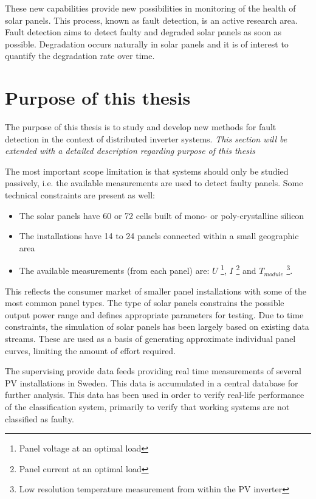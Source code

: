 These new capabilities provide new possibilities in monitoring of the health of solar panels.
This process, known as fault detection, is an active research area.
Fault detection aims to detect faulty and degraded solar panels as soon as possible. 
Degradation occurs naturally in solar panels and it is of interest to quantify the degradation rate over time.

\section{Purpose of this thesis}
The purpose of this thesis is to study and develop new methods for fault detection in the context of distributed inverter systems.
\emph{This section will be extended with a detailed description regarding purpose of this thesis}

The most important scope limitation is that systems should only be studied passively, i.e. the available measurements are used to detect faulty panels.  
Some technical constraints are present as well:
\begin{itemize}
\item The solar panels have 60 or 72 cells built of mono- or poly-crystalline silicon
\item The installations have 14 to 24 panels connected within a small geographic area
\item The available measurements (from each panel) are:
$U$ \footnote{Panel voltage at an optimal load},
$I$ \footnote{Panel current at an optimal load} and
$T_{module}$ \footnote{Low resolution temperature measurement from within the PV inverter}.

\end{itemize}

This reflects the consumer market of smaller panel installations with some of the most common panel types.
The type of solar panels constrains the possible output power range and defines appropriate parameters for testing.
Due to time constraints, the simulation of solar panels has been largely based on existing data streams.
These are used as a basis of generating approximate individual panel curves, limiting the amount of effort required.

The supervising provide data feeds providing real time measurements of several PV installations in Sweden.
This data is accumulated in a central database for further analysis.
This data has been used in order to verify real-life performance of the classification system, primarily to verify that working systems are not classified as faulty.

